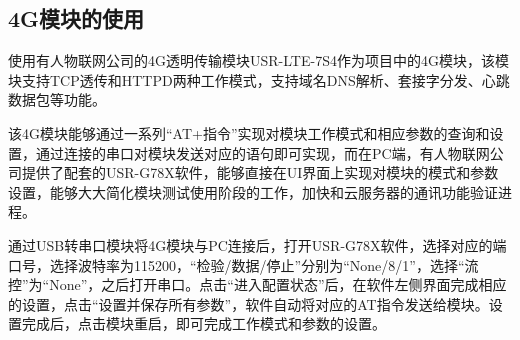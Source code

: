 \documentclass[a4paper,11pt]{ctexart}
\begin{document}
\begin{spacing}{1.5}
\section{4G模块的使用}
\par
使用有人物联网公司的4G透明传输模块USR-LTE-7S4作为项目中的4G模块，该模块支持TCP透传和HTTPD两种工作模式，支持域名DNS解析、套接字分发、心跳数据包等功能。
\par
该4G模块能够通过一系列“AT+指令”实现对模块工作模式和相应参数的查询和设置，通过连接的串口对模块发送对应的语句即可实现，而在PC端，有人物联网公司提供了配套的USR-G78X软件，能够直接在UI界面上实现对模块的模式和参数设置，能够大大简化模块测试使用阶段的工作，加快和云服务器的通讯功能验证进程。
\par
通过USB转串口模块将4G模块与PC连接后，打开USR-G78X软件，选择对应的端口号，选择波特率为115200，“检验/数据/停止”分别为“None/8/1”，选择“流控”为“None”，之后打开串口。点击“进入配置状态”后，在软件左侧界面完成相应的设置，点击“设置并保存所有参数”，软件自动将对应的AT指令发送给模块。设置完成后，点击模块重启，即可完成工作模式和参数的设置。


\end{spacing}
\end{document}
